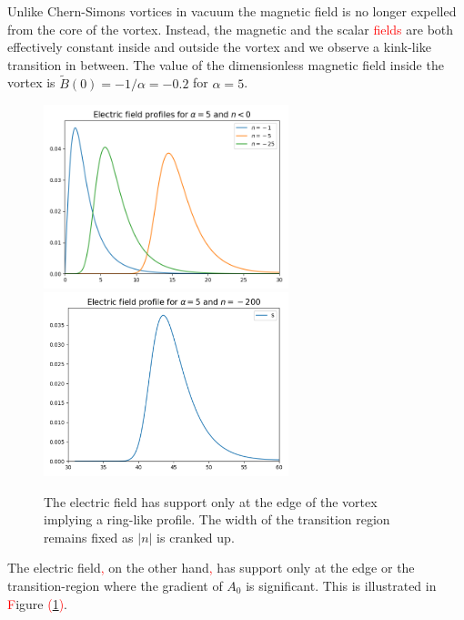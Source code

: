 Unlike Chern-Simons vortices in vacuum \cite{Horvathy:2008hd, Bolognesi:2007ez} the magnetic field is no longer expelled from the core of the vortex. Instead, the magnetic \colorbox{red}{ } and the scalar \textcolor{red}{fields} are both effectively constant \colorbox{red}{ } inside and outside the vortex and we observe a kink-like transition in between.  The value of the dimensionless magnetic field inside the vortex is $\tilde B(0)= -1/\alpha=-0.2$ for $\alpha=5$. 
\begin{figure}[H]
\begin{center}
    \includegraphics[width=2.8in]{Chapter_2_Folder_1912.11321/figures/E_alpha_5_final.png} \includegraphics[width=2.8in]{Chapter_2_Folder_1912.11321/figures/E_alpha_5_n_200.pdf} 
    \caption[This figure shows that the electric field profile for the vortex solutions (in the \textcolor{red}{a}belian Chern-Simons model at finite chemical potential and negative magnetic flux) have a ring-like profile.]{ {\small The electric field has support only at the edge of the vortex implying a ring-like profile. 
   The width of the transition region remains fixed as $|n|$ is cranked up.} }\label{fig:Eneg}
   \end{center}
\end{figure}
 The electric field\textcolor{red}{,} on the other hand\textcolor{red}{,} has support only at the edge or the transition-region where the gradient of $A_0$ is significant. This is illustrated in \textcolor{red}{F}igure \textcolor{red}{(}\ref{fig:Eneg}\textcolor{red}{)}.
